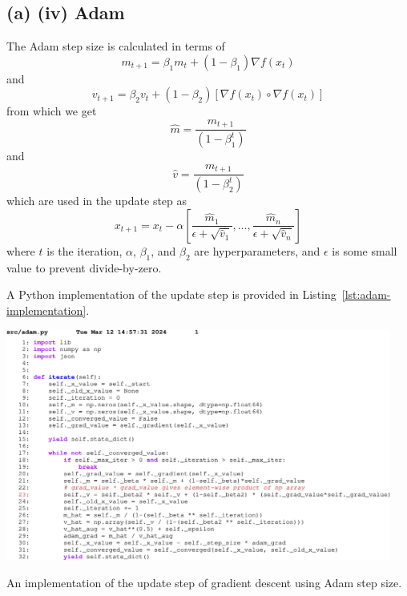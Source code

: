 \subsection{(a) (iv) Adam}

The Adam step size is calculated in terms of
\begin{equation}
  m_{t+1}=\beta_1m_t+(1-\beta_1)\nabla f(x_t)
\end{equation}
and \begin{equation}
  v_{t+1}=\beta_2v_t+(1-\beta_2)[\nabla f(x_t) \circ \nabla f(x_t)]
\end{equation}
from which we get
\begin{equation}
  \hat m=\frac{m_{t+1}}{(1-\beta_1^t)}
\end{equation}
and
\begin{equation}
  \hat v=\frac{m_{t+1}}{(1-\beta_2^t)}
\end{equation}
which are used in the update step as
\begin{equation}
  x_{t+1}=x_t-\alpha[\frac{\hat m_1}{\epsilon + \sqrt{\hat v_1}},\ldots,\frac{\hat m_n}{\epsilon + \sqrt{\hat v_n}}]
\end{equation}
where $t$ is the iteration, $\alpha$, $\beta_1$, and $\beta_2$ are hyperparameters, and $\epsilon$ is some small value to prevent divide-by-zero.

A Python implementation of the update step is provided in Listing~\ref{lst:adam-implementation}.

\begin{listing}
  \begin{center}
    \includegraphics[width=0.95\textwidth]{fig/adam-code.pdf}
  \end{center}
  \caption{An implementation of the update step of gradient descent using Adam step size.}\label{lst:adam-implementation}
\end{listing}
